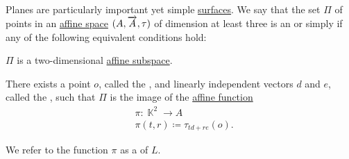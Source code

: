 \begin{definition}\label{def:affine_plane}\mimprovised
  Planes are particularly important yet simple \hyperref[rem:geometric_shape]{surfaces}. We say that the set \( \Pi \) of points in an \hyperref[def:affine_space]{affine space} \( (A, \overrightarrow{A}, \tau) \) of dimension at least three is an  or simply  if any of the following equivalent conditions hold:

  \begin{thmenum}
     \( \Pi \) is a two-dimensional \hyperref[def:affine_subspace]{affine subspace}.

     There exists a point \( o \), called the , and linearly independent vectors \( d \) and \( e \), called the , such that \( \Pi \) is the image of the \hyperref[def:affine_operator]{affine function}
    \begin{equation}\label{eq:def:affine_plane/parametric}
      \begin{aligned}
        &\pi: \BbbK^2 \to A \\
        &\pi(t, r) \coloneqq \tau_{t d + r e}(o).
      \end{aligned}
    \end{equation}

    We refer to the function \( \pi \) as a  of \( L \).
  \end{thmenum}
\end{definition}

